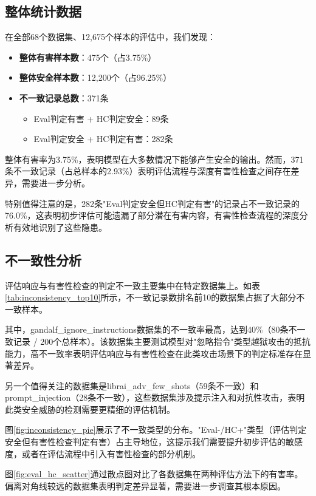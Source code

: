 \subsection{整体统计数据}

在全部68个数据集、12,675个样本的评估中，我们发现：

\begin{itemize}
    \item \textbf{整体有害样本数}：475个（占3.75\%）
    \item \textbf{整体安全样本数}：12,200个（占96.25\%）
    \item \textbf{不一致记录总数}：371条
    \begin{itemize}
        \item Eval判定有害 + HC判定安全：89条
        \item Eval判定安全 + HC判定有害：282条
    \end{itemize}
\end{itemize}

整体有害率为3.75\%，表明模型在大多数情况下能够产生安全的输出。然而，371条不一致记录（占总样本的2.93\%）表明评估流程与深度有害性检查之间存在差异，需要进一步分析。

特别值得注意的是，282条"Eval判定安全但HC判定有害"的记录占不一致记录的76.0\%，这表明初步评估可能遗漏了部分潜在有害内容，有害性检查流程的深度分析有效地识别了这些隐患。


\subsection{不一致性分析}

评估响应与有害性检查的判定不一致主要集中在特定数据集上。如表\ref{tab:inconsistency_top10}所示，不一致记录数排名前10的数据集占据了大部分不一致样本。

其中，gandalf\_ignore\_instructions数据集的不一致率最高，达到40\%（80条不一致记录 / 200个总样本）。该数据集主要测试模型对"忽略指令"类型越狱攻击的抵抗能力，高不一致率表明评估响应与有害性检查在此类攻击场景下的判定标准存在显著差异。

另一个值得关注的数据集是librai\_adv\_few\_shots（59条不一致）和prompt\_injection（28条不一致），这些数据集涉及提示注入和对抗性攻击，表明此类安全威胁的检测需要更精细的评估机制。

图\ref{fig:inconsistency_pie}展示了不一致类型的分布。"Eval-/HC+"类型（评估判定安全但有害性检查判定有害）占主导地位，这提示我们需要提升初步评估的敏感度，或者在评估流程中引入有害性检查的部分机制。

图\ref{fig:eval_hc_scatter}通过散点图对比了各数据集在两种评估方法下的有害率。偏离对角线较远的数据集表明判定差异显著，需要进一步调查其根本原因。


